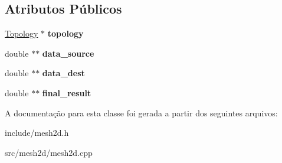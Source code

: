 \subsection*{Atributos Públicos}
\begin{DoxyCompactItemize}
\item 
\hypertarget{classMesh_abf901d73fe1ebdb76ba6d9162683b329}{
\hyperlink{classTopology}{Topology} $\ast$ {\bfseries topology}}
\label{classMesh_abf901d73fe1ebdb76ba6d9162683b329}

\item 
\hypertarget{classMesh_ae12d9067b5e2fbb0cbf94cad12167a07}{
double $\ast$$\ast$ {\bfseries data\_\-source}}
\label{classMesh_ae12d9067b5e2fbb0cbf94cad12167a07}

\item 
\hypertarget{classMesh_a3be1f703aff55f3bf590513f06e9141e}{
double $\ast$$\ast$ {\bfseries data\_\-dest}}
\label{classMesh_a3be1f703aff55f3bf590513f06e9141e}

\item 
\hypertarget{classMesh_a0420b1174dd7c25b1cf3bc91eaccdc24}{
double $\ast$$\ast$ {\bfseries final\_\-result}}
\label{classMesh_a0420b1174dd7c25b1cf3bc91eaccdc24}

\end{DoxyCompactItemize}


A documentação para esta classe foi gerada a partir dos seguintes arquivos:\begin{DoxyCompactItemize}
\item 
include/mesh2d.h\item 
src/mesh2d/mesh2d.cpp\end{DoxyCompactItemize}
